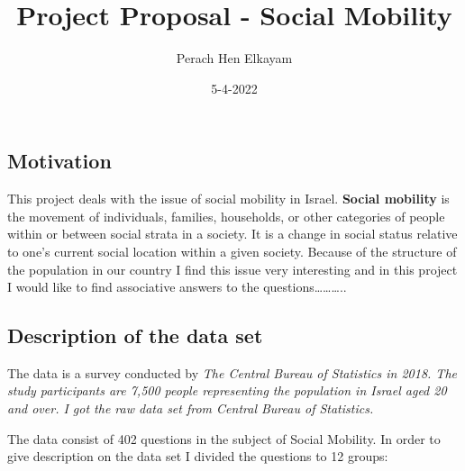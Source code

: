 \documentclass[
]{article}
\title{Project Proposal - Social Mobility}
\author{Perach Hen Elkayam}
\date{5-4-2022}
\begin{document}
\maketitle

\hypertarget{motivation}{%
\subsection{Motivation}\label{motivation}}

This project deals with the issue of social mobility in Israel.
\textbf{Social mobility} is the movement of individuals, families,
households, or other categories of people within or between social
strata in a society. It is a change in social status relative to one's
current social location within a given society. Because of the structure
of the population in our country I find this issue very interesting and
in this project I would like to find associative answers to the
questions\ldots\ldots\ldots..

\hypertarget{description-of-the-data-set}{%
\subsection{Description of the data
set}\label{description-of-the-data-set}}

The data is a survey conducted by \emph{The Central Bureau of Statistics
in 2018. The study participants are 7,500 people representing the
population in Israel aged 20 and over. I got the raw data set from
Central Bureau of Statistics.}

The data consist of 402 questions in the subject of Social Mobility. In
order to give description on the data set I divided the questions to 12
groups:
\end{document}
